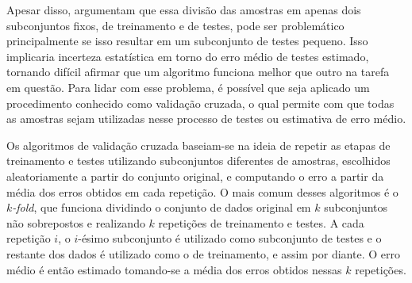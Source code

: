 
Apesar disso,  argumentam que essa divisão das amostras em apenas dois subconjuntos fixos, de treinamento e de testes, pode ser problemático principalmente se isso resultar em um subconjunto de testes pequeno.
Isso implicaria incerteza estatística em torno do erro médio de testes estimado, tornando difícil afirmar que um algoritmo funciona melhor que outro na tarefa em questão.
Para lidar com esse problema, é possível que seja aplicado um procedimento conhecido como validação cruzada, o qual permite com que todas as amostras sejam utilizadas nesse processo de testes ou estimativa de erro médio.

Os algoritmos de validação cruzada baseiam-se na ideia de repetir as etapas de treinamento e testes utilizando subconjuntos diferentes de amostras, escolhidos aleatoriamente a partir do conjunto original, e computando o erro a partir da média dos erros obtidos em cada repetição. 
O mais comum desses algoritmos é o \textit{\(k\)-fold}, que funciona dividindo o conjunto de dados original em \(k\) subconjuntos não sobrepostos e realizando \(k\) repetições de treinamento e testes. 
A cada repetição \(i\), o \(i\)-ésimo subconjunto é utilizado como subconjunto de testes e o restante dos dados é utilizado como o de treinamento, e assim por diante.
O erro médio é então estimado tomando-se a média dos erros obtidos nessas \(k\) repetições.




